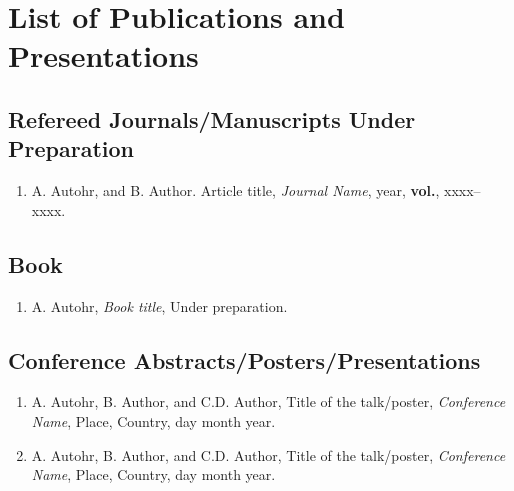 \chapter*{List of Publications and Presentations}
	
\section*{Refereed Journals/Manuscripts Under Preparation}
\begin{enumerate}  
  \item A. Autohr, and B. Author. Article title, \textit{Journal Name}, year, \textbf{vol.}, xxxx--xxxx.   
\end{enumerate}

\section*{Book}	
\begin{enumerate}
\item A. Autohr, \textit{Book title}, Under preparation. 
\end{enumerate}

\section*{Conference Abstracts/Posters/Presentations}
\begin{enumerate}
   \item A. Autohr, B. Author, and C.D. Author, Title of the talk/poster, \textit{Conference Name}, Place, Country, day month year.  

   \item A. Autohr, B. Author, and C.D. Author, Title of the talk/poster, \textit{Conference Name}, Place, Country, day month year.      
\end{enumerate}
